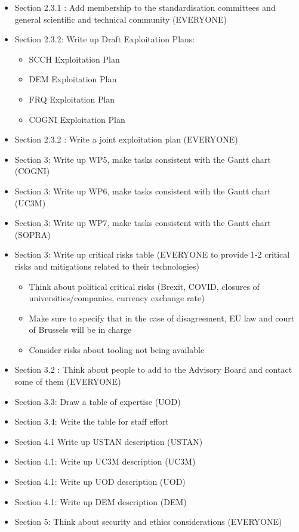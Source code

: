 \documentclass[a4paper,11pt]{article}
\begin{document}
\begin{itemize}
\item Section 2.3.1 : Add membership to the standardisation committees and general scientific and technical community (EVERYONE)

\item Section 2.3.2: Write up Draft Exploitation Plans:
\begin{itemize}
\item SCCH Exploitation Plan
\item DEM Exploitation Plan
\item FRQ Exploitation Plan
\item COGNI Exploitation Plan
\end{itemize}

\item Section 2.3.2 : Write a joint exploitation plan (EVERYONE)

\item Section 3: Write up WP5, make tasks consistent with the Gantt chart (COGNI)

\item Section 3: Write up WP6, make tasks consistent with the Gantt chart (UC3M)

\item Section 3: Write up WP7, make tasks consistent with the Gantt chart (SOPRA)

\item Section 3: Write up critical risks table (EVERYONE to provide 1-2 critical risks and mitigations related to their technologies)
\begin{itemize}
\item Think about political critical risks (Brexit, COVID, closures of universities/companies, currency exchange rate)
\item Make sure to specify that in the case of disagreement, EU law and court of Brussels will be in charge
\item Consider risks about tooling not being available
\end{itemize}




\item Section 3.2 : Think about people to add to the Advisory Board and contact some of them (EVERYONE)

\item Section 3.3: Draw a table of expertise (UOD)

\item Section 3.4: Write the table for staff effort



\item Section 4.1 Write up USTAN description (USTAN)

\item Section 4.1: Write up UC3M description (UC3M)

\item Section 4.1: Write up UOD description (UOD)

\item Section 4.1: Write up DEM description (DEM)

\item Section 5: Think about security and ethics considerations (EVERYONE)
\end{itemize}
\end{document}
